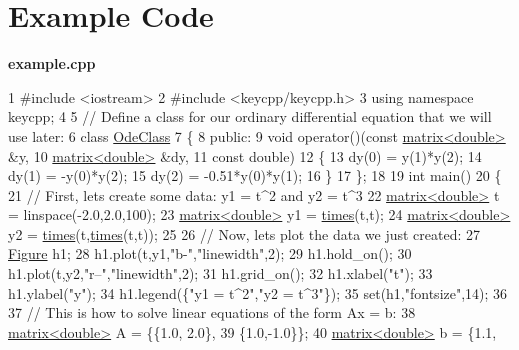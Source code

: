 \section*{\label{_example}%
Example Code}

{\bfseries {\ttfamily example.\-cpp}} 
\begin{DoxyCodeInclude}
1 \textcolor{preprocessor}{#include <iostream>}
2 \textcolor{preprocessor}{#include <keycpp/keycpp.h>}
3 \textcolor{keyword}{using namespace }keycpp;
4 
5 \textcolor{comment}{// Define a class for our ordinary differential equation that we will use later:}
6 \textcolor{keyword}{class }\hyperlink{class_ode_class}{OdeClass}
7 \{
8     \textcolor{keyword}{public}:
9         \textcolor{keywordtype}{void} operator()(\textcolor{keyword}{const} \hyperlink{classkeycpp_1_1matrix}{matrix<double>} &y,
10                         \hyperlink{classkeycpp_1_1matrix}{matrix<double>} &dy,
11                         \textcolor{keyword}{const} \textcolor{keywordtype}{double})
12         \{
13             dy(0) = y(1)*y(2);
14             dy(1) = -y(0)*y(2);
15             dy(2) = -0.51*y(0)*y(1);
16         \}
17 \};
18 
19 \textcolor{keywordtype}{int} main()
20 \{
21     \textcolor{comment}{// First, lets create some data: y1 = t^2 and y2 = t^3}
22     \hyperlink{classkeycpp_1_1matrix}{matrix<double>} t = linspace(-2.0,2.0,100);
23     \hyperlink{classkeycpp_1_1matrix}{matrix<double>} y1 = \hyperlink{namespacekeycpp_a23a0fd48168263aad7f77f1769dc2f2a}{times}(t,t);
24     \hyperlink{classkeycpp_1_1matrix}{matrix<double>} y2 = \hyperlink{namespacekeycpp_a23a0fd48168263aad7f77f1769dc2f2a}{times}(t,\hyperlink{namespacekeycpp_a23a0fd48168263aad7f77f1769dc2f2a}{times}(t,t));
25 
26     \textcolor{comment}{// Now, lets plot the data we just created:}
27     \hyperlink{classkeycpp_1_1_figure}{Figure} h1;
28     h1.plot(t,y1,\textcolor{stringliteral}{"b-"},\textcolor{stringliteral}{"linewidth"},2);
29     h1.hold\_on();
30     h1.plot(t,y2,\textcolor{stringliteral}{"r--"},\textcolor{stringliteral}{"linewidth"},2);
31     h1.grid\_on();
32     h1.xlabel(\textcolor{stringliteral}{"t"});
33     h1.ylabel(\textcolor{stringliteral}{"y"});
34     h1.legend(\{\textcolor{stringliteral}{"y1 = t^2"},\textcolor{stringliteral}{"y2 = t^3"}\});
35     set(h1,\textcolor{stringliteral}{"fontsize"},14);
36 
37     \textcolor{comment}{// This is how to solve linear equations of the form Ax = b:}
38     \hyperlink{classkeycpp_1_1matrix}{matrix<double>} A = \{\{1.0, 2.0\},
39                         \{1.0,-1.0\}\};
40     \hyperlink{classkeycpp_1_1matrix}{matrix<double>} b = \{1.1,

\end{DoxyCodeInclude}

